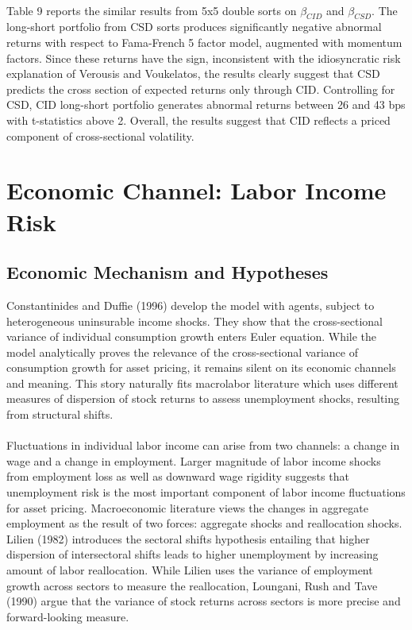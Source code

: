 \documentclass[12pt]{article}
\begin{document}
\paragraph{}
Table 9 reports the similar results from 5x5 double sorts on $\beta_{CID}$ and $\beta_{CSD}$. The long-short portfolio from CSD sorts produces significantly negative abnormal returns with respect to Fama-French 5 factor model, augmented with momentum factors. Since these returns have the sign, inconsistent with the idiosyncratic risk explanation of Verousis and Voukelatos, the results clearly suggest that CSD predicts the cross section of expected returns only through CID. Controlling for CSD, CID long-short portfolio generates abnormal returns between 26 and 43 bps with t-statistics above 2. Overall, the results suggest that CID reflects a priced component of cross-sectional volatility.

\section{Economic Channel: Labor Income Risk} \label{sec:Model}

\subsection{Economic Mechanism and Hypotheses}

Constantinides and Duffie (1996) develop the model with agents, subject to heterogeneous uninsurable income shocks. They show that the cross-sectional variance of individual consumption growth enters Euler equation. While the model analytically proves the relevance of the cross-sectional variance of consumption growth for asset pricing, it remains silent on its economic channels and meaning. This story naturally fits macrolabor literature which uses different measures of dispersion of stock returns to assess unemployment shocks, resulting from structural shifts.
\paragraph{}
Fluctuations in individual labor income can arise from two channels: a change in wage and a change in employment. Larger magnitude of labor income shocks from employment loss as well as downward wage rigidity suggests that unemployment risk is the most important component of labor income fluctuations for asset pricing. Macroeconomic literature views the changes in aggregate employment as the result of two forces: aggregate shocks and reallocation shocks. Lilien (1982) introduces the sectoral shifts hypothesis entailing that higher dispersion of intersectoral shifts leads to higher unemployment by increasing amount of labor reallocation. While Lilien uses the variance of employment growth across sectors to measure the reallocation, Loungani, Rush and Tave (1990) argue that the variance of stock returns across sectors is more precise and forward-looking measure. 
\end{document}
